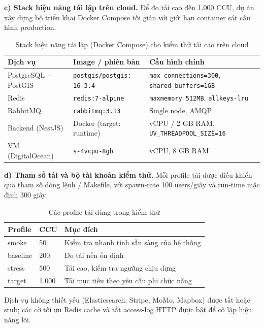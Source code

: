 \noindent\textbf{c) Stack hiệu năng tái lập trên cloud.} Để đo tải cao đến 1.000 CCU, dự án xây dựng bộ triển khai Docker Compose tối giản với giới hạn container sát cấu hình production.

\begin{table}[H]
\centering
\begin{tabularx}{\textwidth}{|>{\raggedright\arraybackslash}p{}|>{\raggedright\arraybackslash}p{}|>{\raggedright\arraybackslash}X|}
\hline
\textbf{Dịch vụ} & \textbf{Image / phiên bản} & \textbf{Cấu hình chính} \\
\hline
PostgreSQL + PostGIS & \texttt{postgis/postgis:} \newline \texttt{16-3.4} & \texttt{max\_connections=300}, \newline \texttt{shared\_buffers=1GB} \\
\hline
Redis & \texttt{redis:7-alpine} & \texttt{maxmemory 512MB}, \newline \texttt{allkeys-lru} \\
\hline
RabbitMQ & \texttt{rabbitmq:3.13} & Single node, AMQP \\
\hline
Backend (NestJS) & Docker (target: runtime) & 1.5 vCPU / 2 GB RAM, \newline \texttt{UV\_THREADPOOL\_SIZE=16} \\
\hline
VM (DigitalOcean) & \texttt{s-4vcpu-8gb} & 4 vCPU, 8 GB RAM \\
\hline
\end{tabularx}
\caption{Stack hiệu năng tái lập (Docker Compose) cho kiểm thử tải cao trên cloud}
\label{tab:perf_docker_stack}
\end{table}
\noindent\textbf{d) Tham số tải và bộ tài khoản kiểm thử.} Mỗi profile tải được điều khiển qua tham số dòng lệnh / Makefile, với spawn-rate 100 users/giây và run-time mặc định 300 giây:

\begin{table}[H]
\centering
\begin{tabularx}{\textwidth}{|p{}|p{}|X|}
\hline
\textbf{Profile} & \textbf{CCU} & \textbf{Mục đích} \\
\hline
smoke & 50 & Kiểm tra nhanh tính sẵn sàng của hệ thống \\
\hline
baseline & 200 & Đo tải nền ổn định \\
\hline
stress & 500 & Tải cao, kiểm tra ngưỡng chịu đựng \\
\hline
target & 1.000 & Tải mục tiêu theo yêu cầu phi chức năng \\
\hline
\end{tabularx}
\caption{Các profile tải dùng trong kiểm thử}
\label{tab:perf_profiles}
\end{table}
Dịch vụ không thiết yếu (Elasticsearch, Stripe, MoMo, Mapbox) được tắt hoặc stub; các cờ tối ưu Redis cache và tắt access-log HTTP được bật để cô lập hiệu năng lõi.


